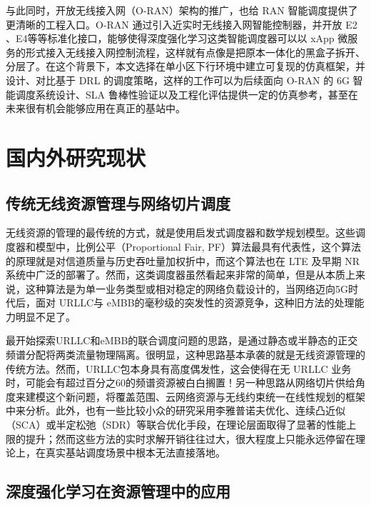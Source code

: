 与此同时，开放无线接入网（O-RAN）架构的推广，也给 RAN 智能调度提供了更清晰的工程入口\cite{dai2025}。O-RAN 通过引入近实时无线接入网智能控制器，并开放 E2 、E4等等标准化接口，能够使得深度强化学习这类智能调度器可以以 xApp 微服务的形式接入无线接入网控制流程\cite{dai2025, choi2024}，这样就有点像是把原本一体化的黑盒子拆开、分层了。在这个背景下，本文选择在单小区下行环境中建立可复现的仿真框架，并设计、对比基于 DRL 的调度策略，这样的工作可以为后续面向 O-RAN 的 6G 智能调度系统设计、SLA 鲁棒性验证以及工程化评估提供一定的仿真参考，甚至在未来很有机会能够应用在真正的基站中。



\section{国内外研究现状}\label{12-ux56fdux5185ux5916ux7814ux7a76ux73b0ux72b6}

\subsection{传统无线资源管理与网络切片调度}\label{121-ux4f20ux7edfux65e0ux7ebfux8d44ux6e90ux7ba1ux7406ux4e0eux7f51ux7edcux5207ux7247ux8c03ux5ea6}

无线资源的管理的最传统的方式，就是使用启发式调度器和数学规划模型。这些调度器和模型中，比例公平（Proportional Fair, PF）算法最具有代表性，这个算法的原理就是对信道质量与历史吞吐量加权折中，而这个算法也在 LTE 及早期 NR 系统中广泛的部署了\cite{kavehmadavani2024}。然而，这类调度器虽然看起来非常的简单，但是从本质上来说，这种算法是为单一业务类型或相对稳定的网络负载设计的，当网络迈向5G时代后，面对 URLLC与 eMBB的毫秒级的突发性的资源竞争，这种旧方法的处理能力明显不足了\cite{feng2020}。

最开始探索URLLC和eMBB的联合调度问题的思路，是通过静态或半静态的正交频谱分配将两类流量物理隔离。很明显，这种思路基本承袭的就是无线资源管理的传统方法。然而，URLLC包本身具有高度偶发性，这会使得在无 URLLC 业务时，可能会有超过百分之60的频谱资源被白白搁置\cite{ji2018, popovski2018}！另一种思路从网络切片供给角度来建模这个新问题，将覆盖范围、云网络资源与无线约束统一在线性规划的框架中来分析\cite{luu2020}。此外，也有一些比较小众的研究采用李雅普诺夫优化、连续凸近似（SCA）或半定松弛（SDR）等联合优化手段，在理论层面取得了显著的性能上限的提升；然而这些方法的实时求解开销往往过大，很大程度上只能永远停留在理论上，在真实基站调度场景中根本无法直接落地\cite{feng2020, yang2021bursty}。

\subsection{深度强化学习在资源管理中的应用}\label{122-ux6df7ux5408ux5f3aux5316ux5b66ux4e60ux5728ux8d44ux6e90ux7ba1ux7406ux4e2dux7684ux5e94ux7528}

